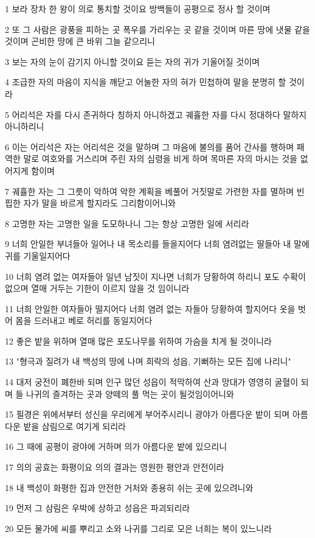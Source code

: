 \par 1 보라 장차 한 왕이 의로 통치할 것이요 방백들이 공평으로 정사 할 것이며
\par 2 또 그 사람은 광풍을 피하는 곳 폭우를 가리우는 곳 같을 것이며 마른 땅에 냇물 같을 것이며 곤비한 땅에 큰 바위 그늘 같으리니
\par 3 보는 자의 눈이 감기지 아니할 것이요 듣는 자의 귀가 기울어질 것이며
\par 4 조급한 자의 마음이 지식을 깨닫고 어눌한 자의 혀가 민첩하여 말을 분명히 할 것이라
\par 5 어리석은 자를 다시 존귀하다 칭하지 아니하겠고 궤휼한 자를 다시 정대하다 말하지 아니하리니
\par 6 이는 어리석은 자는 어리석은 것을 말하며 그 마음에 불의를 품어 간사를 행하며 패역한 말로 여호와를 거스리며 주린 자의 심령을 비게 하며 목마른 자의 마시는 것을 없어지게 함이며
\par 7 궤휼한 자는 그 그릇이 악하여 악한 계획을 베풀어 거짓말로 가련한 자를 멸하며 빈핍한 자가 말을 바르게 할지라도 그리함이어니와
\par 8 고명한 자는 고명한 일을 도모하나니 그는 항상 고명한 일에 서리라
\par 9 너희 안일한 부녀들아 일어나 내 목소리를 들을지어다 너희 염려없는 딸들아 내 말에 귀를 기울일지어다
\par 10 너희 염려 없는 여자들아 일년 남짓이 지나면 너희가 당황하여 하리니 포도 수확이 없으며 열매 거두는 기한이 이르지 않을 것 임이니라
\par 11 너희 안일한 여자들아 떨지어다 너희 염려 없는 자들아 당황하여 할지어다 옷을 벗어 몸을 드러내고 베로 허리를 동일지어다
\par 12 좋은 밭을 위하며 열매 많은 포도나무를 위하여 가슴을 치게 될 것이니라
\par 13 "형극과 질려가 내 백성의 땅에 나며 희락의 성읍, 기뻐하는 모든 집에 나리니"
\par 14 대저 궁전이 폐한바 되며 인구 많던 성읍이 적막하여 산과 망대가 영영히 굴혈이 되며 들 나귀의 즐겨하는 곳과 양떼의 풀 먹는 곳이 될것임이어니와
\par 15 필경은 위에서부터 성신을 우리에게 부어주시리니 광야가 아름다운 밭이 되며 아름다운 밭을 삼림으로 여기게 되리라
\par 16 그 때에 공평이 광야에 거하며 의가 아름다운 밭에 있으리니
\par 17 의의 공효는 화평이요 의의 결과는 영원한 평안과 안전이라
\par 18 내 백성이 화평한 집과 안전한 거처와 종용히 쉬는 곳에 있으려니와
\par 19 먼저 그 삼림은 우박에 상하고 성읍은 파괴되리라
\par 20 모든 물가에 씨를 뿌리고 소와 나귀를 그리로 모은 너희는 복이 있느니라

